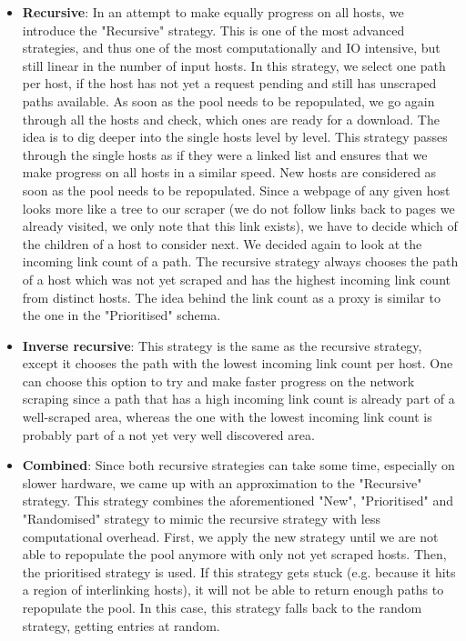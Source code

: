 \documentclass[USenglish,oneside,twocolumn]{article}
\begin{document}
\begin{itemize}
  \item \textbf{Recursive}: In an attempt to make equally progress on all hosts, we introduce the "Recursive" strategy. This is one of the most advanced strategies, and thus one of the most computationally and IO intensive, but still linear in the number of input hosts. In this strategy, we select one path per host, if the host has not yet a request pending and still has unscraped paths available. As soon as the pool needs to be repopulated, we go again through all the hosts and check, which ones are ready for a download. The idea is to dig deeper into the single hosts level by level. This strategy passes through the single hosts as if they were a linked list and ensures that we make progress on all hosts in a similar speed. New hosts are considered as soon as the pool needs to be repopulated. Since a webpage of any given host looks more like a tree to our scraper (we do not follow links back to pages we already visited, we only note that this link exists), we have to decide which of the children of a host to consider next. We decided again to look at the incoming link count of a path. The recursive strategy always chooses the path of a host which was not yet scraped and has the highest incoming link count from distinct hosts. The idea behind the link count as a proxy is similar to the one in the "Prioritised" schema.
  \item \textbf{Inverse recursive}: This strategy is the same as the recursive strategy, except it chooses the path with the lowest incoming link count per host. One can choose this option to try and make faster progress on the network scraping since a path that has a high incoming link count is already part of a well-scraped area, whereas the one with the lowest incoming link count is probably part of a not yet very well discovered area.
  \item \textbf{Combined}: Since both recursive strategies can take some time, especially on slower hardware, we came up with an approximation to the "Recursive" strategy. This strategy combines the aforementioned "New", "Prioritised" and "Randomised" strategy to mimic the recursive strategy with less computational overhead. First, we apply the new strategy until we are not able to repopulate the pool anymore with only not yet scraped hosts. Then, the prioritised strategy is used. If this strategy gets stuck (e.g. because it hits a region of interlinking hosts), it will not be able to return enough paths to repopulate the pool. In this case, this strategy falls back to the random strategy, getting entries at random.
  

\end{itemize}
\end{document}
